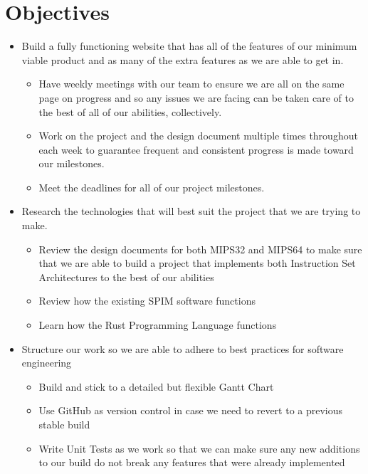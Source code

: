 \documentclass[parskip=half, fontsize=12pt]{scrartcl}
\begin{document}
\section{Objectives}
\begin{itemize}
    \item Build a fully functioning website that has all of the features of our minimum viable product and as many of the extra features as we are able to get in.
    \begin{itemize}
        \item Have weekly meetings with our team to ensure we are all on the same page on progress and so any issues we are facing can be taken care of to the best of all of our abilities, collectively.
        \item Work on the project and the design document multiple times throughout each week to guarantee frequent and consistent progress is made toward our milestones.
        \item Meet the deadlines for all of our project milestones.
    \end{itemize}

    \item Research the technologies that will best suit the project that we are trying to make.
    \begin{itemize}
        \item Review the design documents for both MIPS32 and MIPS64 to make sure that we are able to build a project that implements both Instruction Set Architectures to the best of our abilities
        \item Review how the existing SPIM software functions
        \item Learn how the Rust Programming Language functions
    \end{itemize}
    
    \item Structure our work so we are able to adhere to best practices for software engineering
    \begin{itemize}
        \item Build and stick to a detailed but flexible Gantt Chart
        \item Use GitHub as version control in case we need to revert to a previous stable build
        \item Write Unit Tests as we work so that we can make sure any new additions to our build do not break any features that were already implemented
    \end{itemize}
\end{itemize}
\end{document}
